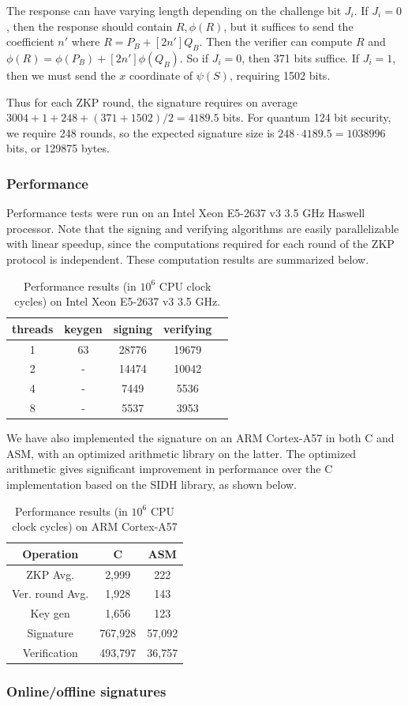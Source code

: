 \documentclass{amsart}
\theoremstyle{plain}
\theoremstyle{remark}
\numberwithin{equation}{section}
\begin{document}
The response can have varying length depending on the challenge bit $J_i$. If $J_i = 0$, then the response should contain $R,\phi(R)$, but it suffices to send the coefficient $n'$ where $R = P_B + [2n']Q_B$. Then the verifier can compute $R$ and $\phi(R) = \phi(P_B)+[2n']\phi(Q_B)$. So if $J_i=0$, then 371 bits suffice. If $J_i=1$, then we must send the $x$ coordinate of $\psi(S)$, requiring 1502 bits.

Thus for each ZKP round, the signature requires on average $3004 + 1 + 248 + (371+1502)/2 = 4189.5$ bits. For quantum 124 bit security, we require 248 rounds, so the expected signature size is $248 \cdot 4189.5 = 1038996$ bits, or 129875 bytes.


\subsubsection{Performance}
Performance tests were run on an Intel Xeon E5-2637 v3 3.5 GHz Haswell processor. Note that the signing and verifying algorithms are easily parallelizable with linear speedup, since the computations required for each round of the ZKP protocol is independent. These computation results are summarized below.  

\begin{table}[ht]
\centering
\begin{tabular}{c | c c c c}
threads	&	keygen 	& 	signing   	& verifying \\ \hline
1		&	63	     	& 	28776   	& 19679     \\ 
2		&	-		&	14474	& 10042	\\
4		&	-		&	7449		& 5536	\\
8		&	-		&	5537		& 3953	
\end{tabular}
\caption{Performance results (in $10^6$ CPU clock cycles) on Intel Xeon E5-2637 v3 3.5 GHz.}
\end{table}

We have also implemented the signature on an ARM Cortex-A57 in both C and ASM, with an optimized arithmetic library on the latter. The optimized arithmetic gives significant improvement in performance over the C implementation based on the SIDH library, as shown below.

\begin{table}[ht]
\centering
\begin{tabular}{c | c | c}
Operation		&	C		& 	ASM	\\ \hline
ZKP Avg.		&	2,999		&	222 	\\
Ver. round Avg. &	1,928		&	143	\\ \hline
Key gen		&	1,656		&	123	\\
Signature		&	767,928	&	57,092	\\
Verification	&	493,797	&	36,757
\end{tabular}
\caption{Performance results (in $10^6$ CPU clock cycles) on ARM Cortex-A57}
\end{table}

\subsubsection{Online/offline signatures}




\begin{thebibliography}{10}


\end{thebibliography}
\end{document}
